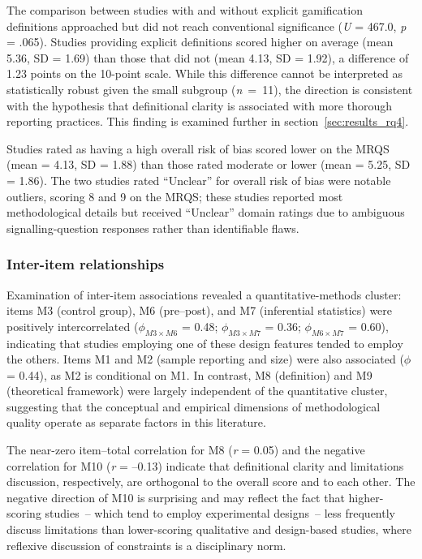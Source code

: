 \documentclass[etq]{acnsart}
\begin{document}
	The comparison between studies with and without explicit gamification definitions approached but did not reach conventional significance (\textit{U} = 467.0, \textit{p} = .065). Studies providing explicit definitions scored higher on average (mean 5.36, SD = 1.69) than those that did not (mean 4.13, SD = 1.92), a difference of 1.23 points on the 10-point scale. While this difference cannot be interpreted as statistically robust given the small subgroup (\textit{n}~=~11), the direction is consistent with the hypothesis that definitional clarity is associated with more thorough reporting practices. This finding is examined further in section~\ref{sec:results_rq4}.
	
	Studies rated as having a high overall risk of bias scored lower on the MRQS (mean = 4.13, SD = 1.88) than those rated moderate or lower (mean = 5.25, SD = 1.86). The two studies rated ``Unclear'' for overall risk of bias were notable outliers, scoring 8 and 9 on the MRQS; these studies reported most methodological details but received ``Unclear'' domain ratings due to ambiguous signalling-question responses rather than identifiable flaws.
	
	\subsubsection{Inter-item relationships}
	\label{sec:results_rq2_interitem}
	
	Examination of inter-item associations revealed a quantitative-methods cluster: items M3 (control group), M6 (pre--post), and M7 (inferential statistics) were positively intercorrelated ($\phi_{M3 \times M6}$ = 0.48; $\phi_{M3 \times M7}$ = 0.36; $\phi_{M6 \times M7}$ = 0.60), indicating that studies employing one of these design features tended to employ the others. Items M1 and M2 (sample reporting and size) were also associated ($\phi$ = 0.44), as M2 is conditional on M1. In contrast, M8 (definition) and M9 (theoretical framework) were largely independent of the quantitative cluster, suggesting that the conceptual and empirical dimensions of methodological quality operate as separate factors in this literature.
	
	The near-zero item--total correlation for M8 (\textit{r} = 0.05) and the negative correlation for M10 (\textit{r} = --0.13) indicate that definitional clarity and limitations discussion, respectively, are orthogonal to the overall score and to each other. The negative direction of M10 is surprising and may reflect the fact that higher-scoring studies~-- which tend to employ experimental designs~-- less frequently discuss limitations than lower-scoring qualitative and design-based studies, where reflexive discussion of constraints is a disciplinary norm.
	
\end{document}
